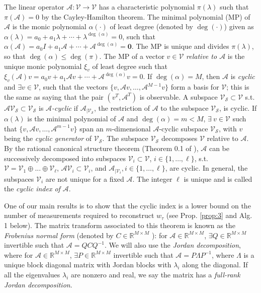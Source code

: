 \documentclass[letterpaper,12pt,peerreviewca,draftcls]{IEEEtran}
\newcommand{\la}{\lambda}
\newcommand{\R}{\mathbb{R}}
\newcommand{\weight}{w}
\newcommand{\sysop}{\mathcal{A}}
\newcommand{\eval}{\la}
\newcommand{\ncent}{M}
\newcommand{\JorP}{P}
\newcommand{\JorLa}{\Lambda}
\newcommand{\charpoly}{\pi}
\newcommand{\minpoly}{\alpha}
\newcommand{\minpolyv}{\xi}
\newcommand{\linvec}{v}
\newcommand{\polycoeff}{a}
\newcommand{\acycdeg}{m}
\newcommand{\minmeas}{\ell}
\newcommand{\linspace}{\mathcal{V}}
\newcommand{\subspace}{\linspace_{\mathcal{S}}}
\newcommand{\restrict}[2]{{#1}_{|#2}}
\newcommand{\tindex}{\tau}
\DeclareMathOperator{\degs}{deg}
\newcommand{\FrobP}{Q}
\newcommand{\FrobC}{C}
\begin{document}
The linear operator $\sysop:\linspace\rightarrow\linspace$ has a characteristic polynomial $\charpoly(\eval) $ such that $\charpoly(\sysop)=0 $ by the Cayley-Hamilton theorem. The minimal polynomial (MP) of $\sysop$ is the monic polynomial $\minpoly(\cdot)$ of least degree (denoted by $\degs(\cdot)$) given as 
$\minpoly(\eval) = \polycoeff_0 + \polycoeff_1\eval +\cdots + \eval^{\degs(\minpoly)} = 0$, such that
$\minpoly(\sysop)=\polycoeff_0 I + \polycoeff_1\sysop +\cdots + \sysop^{\degs(\minpoly)} = \bm{0}$. 
The MP is unique and divides $\charpoly(\lambda)$, so that $ \degs(\minpoly) \leq \degs(\charpoly)$. The MP of a vector $\linvec\in\linspace$ \emph{relative to $\sysop$} is the unique monic polynomial $\minpolyv_{\linvec}$ of least degree such that 
$\minpolyv_{\linvec}(\sysop)\linvec= \polycoeff_0\linvec + \polycoeff_1\sysop\linvec + \cdots + \sysop^{\degs(\minpoly)}\linvec = 0$. 
If $\degs(\alpha) = \ncent$, then $\sysop$ is \emph{cyclic} and $\exists\linvec\in \linspace$, such that the vectors $\{\linvec, \sysop \linvec,\dots,\sysop^{\ncent-1}\linvec\}$ form a basis for $\linspace$; this is the same as saying that the pair $(\linvec^T,\sysop^T)$ is observable.    
A subspace $\subspace\subset\linspace$ s.t. $\sysop\subspace\subset\subspace$ is \emph{$\sysop$-cyclic} if  $\restrict{\sysop}{\subspace}$, the restriction of $\sysop$ to the subspace $\subspace$, is cyclic. If $\minpoly(\eval)$ is the minimal polynomial of $\sysop$ and $\degs(\minpoly) = \acycdeg < \ncent$, $\exists~\linvec\in\linspace$ such that $\{\linvec, \sysop \linvec,\dots,\sysop^{\acycdeg-1}\linvec\}$ span an $\acycdeg$-dimensional $\sysop$-cyclic subspace $\subspace$, with $\linvec$ being the \emph{cyclic generator} of $\subspace$.  The subspace $\subspace$ decomposes $\linspace$ relative to $\sysop$. By the rational canonical structure theorem (Theorem 0.1 of \cite{wonham1974linear}), $\sysop$ can be successively decomposed into subspaces $\linspace_i \subset \linspace$, $i\in \{1,\dots,\minmeas\}$, s.t. $\linspace = \linspace_1 \oplus ... \oplus \linspace_{\minmeas}$, $\sysop\linspace_i \subset \linspace_i$, and  $\sysop_{|\linspace_i}, i \in \{1,\dots,\minmeas\}$, are cyclic. In general, the subspaces $\linspace_i$ are not unique for a fixed $\sysop$. The integer $\minmeas$ is unique and is called the \emph{cyclic index of $\sysop$}. 

One of our main results is to show that the cyclic index is a lower bound on the number of measurements required to reconstruct $\weight_{\tindex}$ (see Prop. \ref{prop:3} and Alg. 1 below). The matrix transform associated to this theorem is known as the \emph{Frobenius normal form} (denoted by $\FrobC\in\R^{\ncent\times\ncent}$ ): for $\sysop\in\R^{\ncent\times\ncent}$,  $\exists \FrobP\in\R^{\ncent\times\ncent}$ invertible  such that $\sysop = \FrobP\FrobC\FrobP^{-1}$. We will also use the \emph{Jordan decomposition}, where for $\sysop\in\R^{\ncent\times\ncent}$, $\exists \JorP\in\R^{\ncent\times\ncent}$ invertible such that $\sysop = \JorP\JorLa \JorP^{-1}$, where $\JorLa$ is a unique block diagonal matrix with Jordan blocks with $\eval_i$ along the diagonal. 
If all the eigenvalues $\eval_i$ are nonzero and real, we say the matrix has a \emph{full-rank Jordan decomposition}. 
\end{document}
